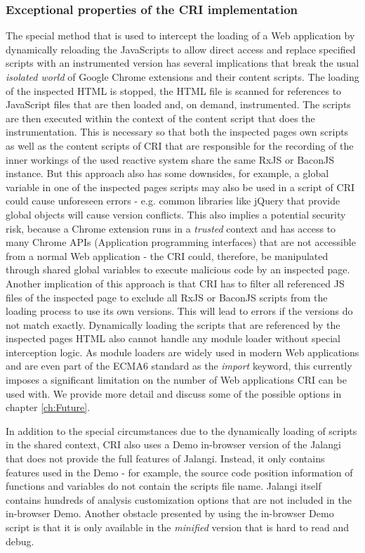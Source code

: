 	\subsubsection{Exceptional properties of the CRI implementation}
	\label{sec:CRISpecials}
	The special method that is used to intercept the loading of a Web application by dynamically reloading the JavaScripts to allow direct access and replace specified scripts with an instrumented version has several implications that break the usual \emph{isolated world} \cite{GoogleApiContentScripts} of Google Chrome extensions and their content scripts. The loading of the inspected HTML is stopped, the HTML file is scanned for references to JavaScript files that are then loaded and, on demand, instrumented. The scripts are then executed within the context of the content script that does the instrumentation. This is necessary so that both the inspected pages own scripts as well as the content scripts of CRI that are responsible for the recording of the inner workings of the used reactive system share the same RxJS or BaconJS instance. But this approach also has some downsides, for example, a global variable in one of the inspected pages scripts may also be used in a script of CRI could cause unforeseen errors - e.g. common libraries like jQuery \cite{jQuery} that provide global objects will cause version conflicts. This also implies a potential security risk, because a Chrome extension runs in a \emph{trusted} context and has access to many Chrome APIs (Application programming interfaces) that are not accessible from a normal Web application - the CRI could, therefore, be manipulated through shared global variables to execute malicious code by an inspected page.
	Another implication of this approach is that CRI has to filter all referenced JS files of the inspected page to exclude all RxJS or BaconJS scripts from the loading process to use its own versions. This will lead to errors if the versions do not match exactly.
	Dynamically loading the scripts that are referenced by the inspected pages HTML also cannot handle any module loader without special interception logic. As module loaders are widely used in modern Web applications and are even part of the ECMA6 \cite{ECMA6import} standard as the \emph{import} keyword, this currently imposes a significant limitation on the number of Web applications CRI can be used with. We provide more detail and discuss some of the possible options in chapter \ref{ch:Future}.
	
	
	In addition to the special circumstances due to the dynamically loading of scripts in the shared context, CRI also uses a Demo \cite{JalangiDemo} in-browser version of the Jalangi \cite{Jalangi} that does not provide the full features of Jalangi. Instead, it only contains features used in the Demo - for example, the source code position information of functions and variables do not contain the scripts file name. Jalangi itself contains hundreds of analysis customization options that are not included in the in-browser Demo. Another obstacle presented by using the in-browser Demo script is that it is only available in the \emph{minified} version that is hard to read and debug.
	
